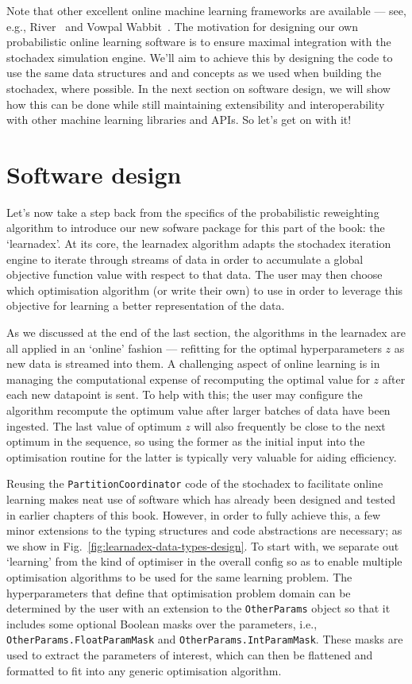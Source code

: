 Note that other excellent online machine learning frameworks are available --- see, e.g., River~\cite{river} and Vowpal Wabbit~\cite{vowpalwabbit}. The motivation for designing our own probabilistic online learning software is to ensure maximal integration with the stochadex simulation engine. We'll aim to achieve this by designing the code to use the same data structures and and concepts as we used when building the stochadex, where possible. In the next section on software design, we will show how this can be done while still maintaining extensibility and interoperability with other machine learning libraries and APIs. So let's get on with it!

\section{\sffamily Software design}

Let's now take a step back from the specifics of the probabilistic reweighting algorithm to introduce our new sofware package for this part of the book: the `learnadex'. At its core, the learnadex algorithm adapts the stochadex iteration engine to iterate through streams of data in order to accumulate a global objective function value with respect to that data. The user may then choose which optimisation algorithm (or write their own) to use in order to leverage this objective for learning a better representation of the data. 

As we discussed at the end of the last section, the algorithms in the learnadex are all applied in an `online' fashion --- refitting for the optimal hyperparameters $z$ as new data is streamed into them. A challenging aspect of online learning is in managing the computational expense of recomputing the optimal value for $z$ after each new datapoint is sent. To help with this; the user may configure the algorithm recompute the optimum value after larger batches of data have been ingested. The last value of optimum $z$ will also frequently be close to the next optimum in the sequence, so using the former as the initial input into the optimisation routine for the latter is typically very valuable for aiding efficiency.

Reusing the \texttt{PartitionCoordinator} code of the stochadex to facilitate online learning makes neat use of software which has already been designed and tested in earlier chapters of this book. However, in order to fully achieve this, a few minor extensions to the typing structures and code abstractions are necessary; as we show in Fig.~\ref{fig:learnadex-data-types-design}. To start with, we separate out `learning' from the kind of optimiser in the overall config so as to enable multiple optimisation algorithms to be used for the same learning problem. The hyperparameters that define that optimisation problem domain can be determined by the user with an extension to the \texttt{OtherParams} object so that it includes some optional Boolean masks over the parameters, i.e., \texttt{OtherParams.FloatParamMask} and \texttt{OtherParams.IntParamMask}. These masks are used to extract the parameters of interest, which can then be flattened and formatted to fit into any generic optimisation algorithm.

